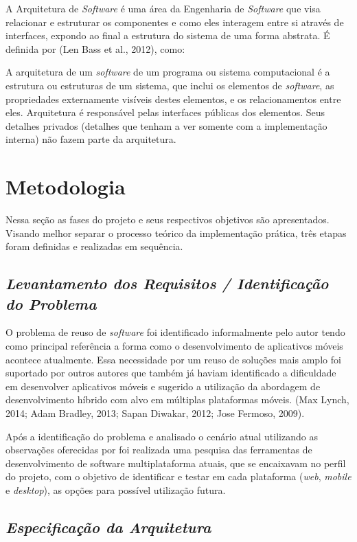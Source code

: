 A Arquitetura de \textit{Software} é uma área da Engenharia de \textit{Software} que visa relacionar e estruturar os componentes e como eles interagem entre si através de interfaces, expondo ao final a estrutura do sistema de uma forma abstrata. É definida por (Len Bass et al., 2012), como:

A arquitetura de um \textit{software} de um programa ou sistema computacional é a estrutura ou estruturas de um sistema, que inclui os elementos de \textit{software}, as propriedades externamente visíveis destes elementos, e os relacionamentos entre eles. Arquitetura é responsável pelas interfaces públicas dos elementos. Seus detalhes privados (detalhes que tenham a ver somente com a implementação interna) não fazem parte da arquitetura.

\section{\esp Metodologia}
Nessa seção as fases do projeto e seus respectivos objetivos são apresentados. Visando melhor separar o processo teórico da implementação prática, três etapas foram definidas e realizadas em sequência.

\subsection{{\it Levantamento dos Requisitos / Identificação do Problema}}
O problema de reuso de \textit{software} foi identificado informalmente pelo autor tendo como principal referência a forma como o desenvolvimento de aplicativos móveis acontece atualmente. Essa necessidade por um reuso de soluções mais amplo foi suportado por outros autores que também já haviam identificado a dificuldade em desenvolver aplicativos móveis e sugerido a utilização da abordagem de desenvolvimento híbrido com alvo em múltiplas plataformas móveis. (Max Lynch, 2014; Adam Bradley, 2013; Sapan Diwakar, 2012; Jose Fermoso, 2009). 

Após a identificação do problema e analisado o cenário atual utilizando as observações oferecidas por \cite{Diwakar2012} foi realizada uma pesquisa das ferramentas de desenvolvimento de software multiplataforma atuais, que se encaixavam no perfil do projeto, com o objetivo de identificar e testar em cada plataforma (\textit{web}, \textit{mobile} e \textit{desktop}), as opções para possível utilização futura. 

\subsection{{\it Especificação da Arquitetura}}

